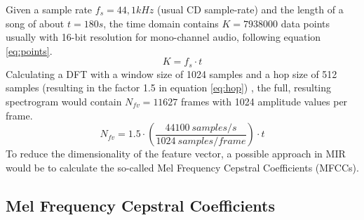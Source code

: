 Given a sample rate $f_s = 44,1kHz$ (usual CD sample-rate) and the length of a song of about $t = 180s$, the time domain contains $K = 7938000$ data points usually with 16-bit resolution for mono-channel audio, following equation \eqref{eq:points}. 
\begin{equation} \label{eq:points}
K = f_s \cdot t
\end{equation}
Calculating a DFT with a window size of 1024 samples and a hop size of 512 samples (resulting in the factor 1.5 in equation \eqref{eq:hop}) \cite[p. 41]{knees1}, the full, resulting spectrogram would contain $N_{fv} = 11627$ frames with 1024 amplitude values per frame.
\begin{equation} \label{eq:hop}
N_{fv} = 1.5 \cdot (\frac{44100 \ samples/s}{1024 \ samples/frame}) \cdot t
\end{equation}
To reduce the dimensionality of the feature vector, a possible approach in MIR would be to calculate the so-called Mel Frequency Cepstral Coefficients (MFCCs).

\subsection{Mel Frequency Cepstral Coefficients}\label{mfccsim}

